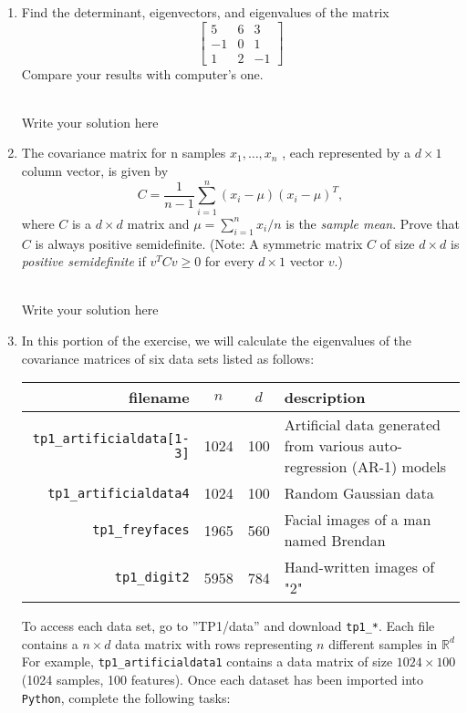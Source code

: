 \documentclass[a4paper]{article}
\begin{document}
\begin{enumerate}
    \item Find the determinant, eigenvectors, and eigenvalues of the matrix
    \[
    \begin{bmatrix}
        5 & 6 & 3 \\
        -1 & 0 & 1 \\
        1 & 2 & -1
    \end{bmatrix}
    \]
    Compare your results with computer’s one.
    
    \hrulefill \\
    Write your solution here

    
    \item The covariance matrix for n samples $x_1, \dots, x_n$ , each represented by a $d \times 1$ column vector, is given by
    \[
    C = \frac{1}{n - 1} \sum^n_{i=1} (x_i - \mu)(x_i - \mu)^T,
    \]
    where $C$ is a $d \times d$ matrix and $\mu = \sum^n_{i=1} x_i/n$ is the \textit{sample mean}.
    Prove that $C$ is always positive semidefinite. (Note: A symmetric matrix $C$ of size $d \times d$ is \textit{positive semidefinite} if $v^T C v \geq 0$ for every $d \times 1$ vector $v$.)
    
    \hrulefill \\
    Write your solution here
    
    \item In this portion of the exercise, we will calculate the eigenvalues of the covariance matrices of six data sets listed as follows:
    \begin{table}[H]
    \centering
    \begin{tabularx}{.7\textwidth}{rccX}
    \hline
    filename                          & $n$  & $d$ & description                                                          \\ \hline
    \texttt{tp1\_artificialdata[1-3]} & 1024 & 100 & Artificial data generated from various auto-regression (AR-1) models \\
    \texttt{tp1\_artificialdata4}     & 1024 & 100 & Random Gaussian data                                                 \\
    \texttt{tp1\_freyfaces}           & 1965 & 560 & Facial images of a man named Brendan                                         \\
    \texttt{tp1\_digit2}              & 5958 & 784 & Hand-written images of "2"                                           \\ \hline
    \end{tabularx}
    \end{table}
    To access each data set, go to ''TP1/data'' and download \texttt{tp1\_*}.
    Each file contains a $n \times d$ data matrix with rows representing $n$ different samples in $\mathbb{R}^d$
    For example, \texttt{tp1\_artificialdata1} contains a data matrix of size $1024 \times 100$ (1024 samples, 100 features).
    Once each dataset has been imported into \texttt{Python}, complete the following tasks:
    

\end{enumerate}
\end{document}
